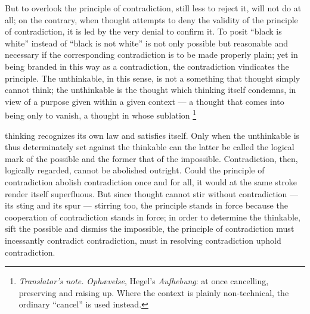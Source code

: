 \documentclass[12pt,a4paper]{book}
\renewcommand{\thefootnote}{\ifcase\value{footnote}\or *)\or **)\or ***)\fi}
\newcommand{\tnote}[1]{%
  \begingroup
  \renewcommand{\thefootnote}{\textdagger}%
  \footnote{\emph{Translator's note.} #1}%
  \addtocounter{footnote}{-1}%
  \endgroup}
\begin{document}
But to overlook the principle of contradiction, still less to reject it, will
not do at all; on the contrary, when thought attempts to deny the validity of
the principle of contradiction, it is led by the very denial to confirm it. To
posit ``black is white'' instead of ``black is not white'' is not only possible
but reasonable and necessary if the corresponding contradiction is to be made
properly plain; yet in being branded in this way as a contradiction, the
contradiction vindicates the principle. The unthinkable, in this sense, is not
a something that thought simply cannot think; the unthinkable is the thought
which thinking itself condemns, in view of a purpose given within a given
context --- a thought that comes into being only to vanish, a thought in whose
sublation\tnote{\emph{Ophævelse}, Hegel's \textit{Aufhebung}: at once
cancelling, preserving and raising up. Where the context is plainly
non-technical, the ordinary ``cancel'' is used instead.} thinking recognizes
its own law and satisfies itself. Only when the unthinkable is thus
determinately set against the thinkable can the latter be called the logical
mark of the possible and the former that of the impossible. Contradiction,
then, logically regarded, cannot be abolished outright. Could the principle of
contradiction abolish contradiction once and for all, it would at the same
stroke render itself superfluous. But since thought cannot stir without
contradiction --- its sting and its spur --- stirring too, the principle stands
in force because the cooperation of contradiction stands in force; in order to
determine the thinkable, sift the possible and dismiss the impossible, the
principle of contradiction must incessantly contradict contradiction, must in
resolving contradiction uphold contradiction.
\end{document}
